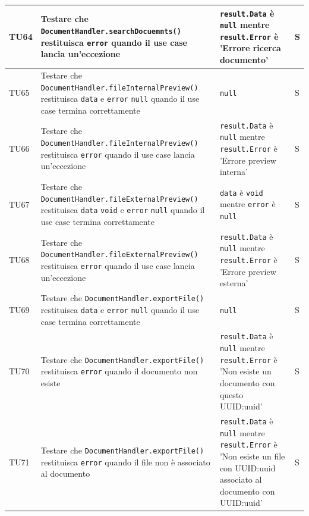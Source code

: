 \documentclass[a4paper,12pt]{article}
\begin{document}
\begin{longtable}{|M{1.2cm}|M{5cm}|M{5cm}|M{1.5cm}|}
            TU64 & Testare che \texttt{DocumentHandler.searchDocuemnts()} restituisca \texttt{error} quando il use case lancia un'eccezione & \texttt{result.Data} è \texttt{null} mentre \texttt{result.Error} è 'Errore ricerca documento' & S \\
            \hline

            TU65 & Testare che \texttt{DocumentHandler.fileInternalPreview()} restituisca \texttt{data} e \texttt{error} \texttt{null} quando il use case termina correttamente & \texttt{null} & S \\
            \hline

            TU66 & Testare che \texttt{DocumentHandler.fileInternalPreview()} restituisca \texttt{error} quando il use case lancia un'eccezione & \texttt{result.Data} è \texttt{null} mentre \texttt{result.Error} è 'Errore preview interna' & S \\
            \hline

            TU67 & Testare che \texttt{DocumentHandler.fileExternalPreview()} restituisca \texttt{data} \texttt{void} e \texttt{error} \texttt{null} quando il use case termina correttamente & \texttt{data} è \texttt{void} mentre \texttt{error} è \texttt{null} & S \\
            \hline

            TU68 & Testare che \texttt{DocumentHandler.fileExternalPreview()} restituisca \texttt{error} quando il use case lancia un'eccezione & \texttt{result.Data} è \texttt{null} mentre \texttt{result.Error} è 'Errore preview esterna' & S \\
            \hline

            TU69 & Testare che \texttt{DocumentHandler.exportFile()} restituisca \texttt{data} e \texttt{error} \texttt{null} quando il use case termina correttamente & \texttt{null} & S \\
            \hline

            TU70 & Testare che \texttt{DocumentHandler.exportFile()} restituisca \texttt{error} quando il documento non esiste & \texttt{result.Data} è \texttt{null} mentre \texttt{result.Error} è 'Non esiste un documento con questo UUID:uuid' & S \\
            \hline

            TU71 & Testare che \texttt{DocumentHandler.exportFile()} restituisca \texttt{error} quando il file non è associato al documento & \texttt{result.Data} è \texttt{null} mentre \texttt{result.Error} è 'Non esiste un file con UUID:uuid associato al documento con UUID:uuid' & S \\
            \hline


\end{longtable}
\end{document}
